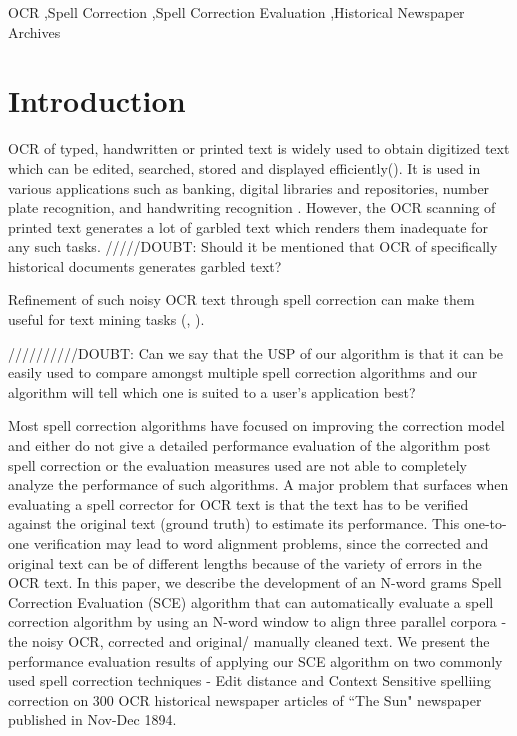\documentclass[preprint,11pt]{elsarticle}
\begin{document}
\begin{frontmatter}
\begin{keyword}
 OCR \sep Spell Correction \sep Spell Correction Evaluation \sep Historical Newspaper Archives


\end{keyword}

\end{frontmatter}




\section{Introduction}

OCR of typed, handwritten or printed text is widely used to obtain digitized text which can be edited, searched, stored and displayed efficiently(\cite{torget2011mapping,palfray2012logical}). It is used in various applications such as banking, digital libraries \cite{mcmurdo2013vermont} and repositories, number plate recognition, and handwriting recognition \cite{singh2012survey}. However, the OCR scanning of printed text generates a lot of garbled text which renders them inadequate for any such tasks.
/////DOUBT: Should it be mentioned that OCR of specifically historical documents generates garbled text?

 Refinement of such noisy OCR text through spell correction can make them useful for text mining tasks (\cite{dutta2011learning}, \cite{yang2011topic}). 

//////////DOUBT: Can we say that the USP of our algorithm is that it can be easily used to compare amongst multiple spell correction algorithms and our algorithm will tell which one is suited to a user's application best?

Most spell correction algorithms have focused on improving the correction model and either do not give a detailed performance evaluation of the algorithm post spell correction or the evaluation measures used are not able to completely analyze the performance of such algorithms.  
A major problem that surfaces when evaluating a spell corrector for OCR text is that the text has to be verified against the original text (ground truth) to estimate its performance. This one-to-one verification may lead to word alignment problems, since the corrected and original text can be of different lengths because of the variety of errors in the OCR text.
In this paper, we describe the development of an N-word grams Spell Correction Evaluation (SCE) algorithm that can automatically evaluate a spell correction algorithm by using an N-word window to align three parallel corpora - the noisy OCR, corrected and original/ manually cleaned text. 
We present the performance evaluation results of applying our SCE algorithm on two  commonly used spell correction techniques - Edit distance and Context Sensitive spelliing correction on 300 OCR historical newspaper articles of ``The Sun" newspaper published in Nov-Dec 1894. 
\end{document}
